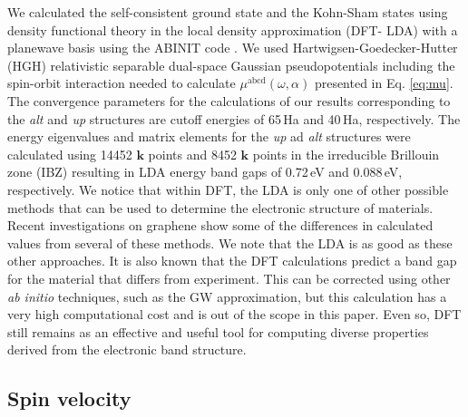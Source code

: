 \documentclass[prb,11pt,tightenlines,twocolumn,aps]{revtex4-1}
\begin{document}
{\color{red} We calculated the self-consistent ground state and the Kohn-Sham
states using density functional theory in the local density approximation (DFT-
LDA) with a planewave basis using the ABINIT code \cite{gonzeCPC09}.}
% 
We used Hartwigsen-Goedecker-Hutter (HGH) relativistic separable dual-space
Gaussian pseudopotentials \cite{hartwigsenPRB98} including the spin-orbit
interaction needed to calculate $\mu^{\mathrm{abcd}}(\omega,\alpha)$ presented
in Eq.
\eqref{eq:mu}.
% 
The convergence parameters for the calculations of our results corresponding to
the \emph{alt} and \emph{up} structures are cutoff energies of 65\,Ha and
40\,Ha, respectively. The energy eigenvalues and matrix elements for the
\emph{up} ad \emph{alt} structures were calculated using 14452 $\mathbf{k}$
points and 8452 $\mathbf{k}$ points in the irreducible Brillouin zone (IBZ)
{\color{red} resulting in LDA energy band gaps of 0.72\,eV and 0.088\,eV,
respectively.
% 
We notice that within DFT, the LDA is only one of other possible methods that
can be used to determine the electronic structure of materials. Recent
investigations on graphene show some of the differences in calculated values
from several of these methods\cite{karamanisJPCC15,botelloACR14}. We note that
the LDA is as good as these other approaches. It is also known that the DFT
calculations predict a band gap for the material that differs from experiment.
This can be corrected using other \emph{ab initio} techniques, such as the GW
approximation\cite{onidaRMP02}, but this calculation has a very high
computational cost and is out of the scope in this paper. Even so, DFT still
remains as an effective and useful tool for computing diverse properties derived
from the electronic band structure.}


\subsection{Spin velocity} %
\label{sec:res-spin_velocity}
\end{document}
